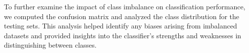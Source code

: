 To further examine the impact of class imbalance on classification performance, we computed the confusion matrix and analyzed the class distribution for the testing sets. This analysis helped identify any biases arising from imbalanced datasets and provided insights into the classifier’s strengths and weaknesses in distinguishing between classes.
